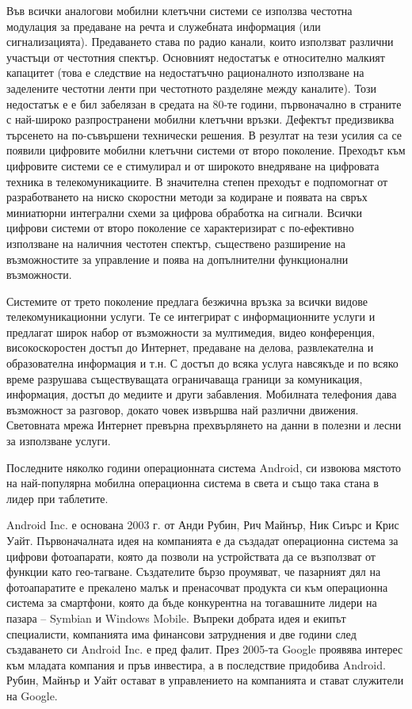 Във всички аналогови мобилни клетъчни системи се използва честотна модулация за предаване на речта и служебната информация (или сигнализацията). Предаването става по радио канали, които използват различни участъци от честотния спектър. Основният недостатък е относително малкият капацитет (това е следствие на недостатъчно рационалното използване на заделените честотни ленти при честотното разделяне между каналите). Този недостатък е е бил забелязан в средата на 80-те години, първоначално в страните с най-широко разпространени мобилни клетъчни връзки. Дефектът предизвиква търсенето на по-съвършени технически решения. В резултат на тези усилия са се появили цифровите мобилни клетъчни системи от второ поколение. Преходът към цифровите системи се е стимулирал и от широкото внедряване на цифровата техника в телекомуникациите. В значителна степен преходът е подпомогнат от разработването на ниско скоростни методи за кодиране и появата на свръх миниатюрни интегрални схеми за цифрова обработка на сигнали. Всички цифрови системи от второ поколение се характеризират с по-ефективно използване на наличния честотен спектър, съществено разширение на възможностите за управление и поява на допълнителни функционални възможности.

Системите от трето поколение предлага безжична връзка за всички видове телекомуникационни услуги. Те се интегрират с информационните услуги и предлагат широк набор от възможности за мултимедия, видео конференция, високоскоростен достъп до Интернет, предаване на делова, развлекателна и образователна информация и т.н. С достъп до всяка услуга навсякъде и по всяко време разрушава съществуващата ограничаваща граници за комуникация, информация, достъп до медиите и други забавления. Мобилната телефония дава възможност за разговор, докато човек извършва най различни движения. Световната мрежа Интернет превърна прехвърлянето на данни в полезни и лесни за използване услуги. 

Последните няколко години операционната система Android, си извоюва мястото на най-популярна мобилна операционна система в света и също така стана в лидер при таблетите.

Android Inc. е основана 2003 г. от Анди Рубин, Рич Майнър, Ник Сиърс и Крис Уайт. Първоначалната идея на компанията е да създадат операционна система за цифрови фотоапарати, която да позволи на устройствата да се възползват от функции като гео-тагване. Създателите бързо проумяват, че пазарният дял на фотоапаратите е прекалено малък и пренасочват продукта си към операционна система за смартфони, която да бъде конкурентна на тогавашните лидери на пазара – Symbian и Windows Mobile. Въпреки добрата идея и екипът специалисти, компанията има финансови затруднения и две години след създаването си Android Inc. е пред фалит. През 2005-та Google проявява интерес към младата компания и пръв инвестира, а в последствие придобива Android. Рубин, Майнър и Уайт остават в управлението на компанията и стават служители на Google.

